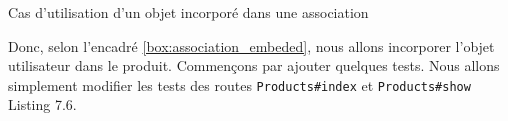 \documentclass[]{report}
\begin{document}
\begin{tcolorbox}{Cas d'utilisation d'un objet incorporé dans une association}
    \end{tcolorbox}

    Donc, selon l'encadré \ref{box:association_embeded}, nous allons incorporer l'objet utilisateur dans le produit. Commençons par ajouter quelques tests. Nous allons simplement modifier les tests des routes \verb|Products#index| et \verb|Products#show| Listing 7.6.

\end{document}
